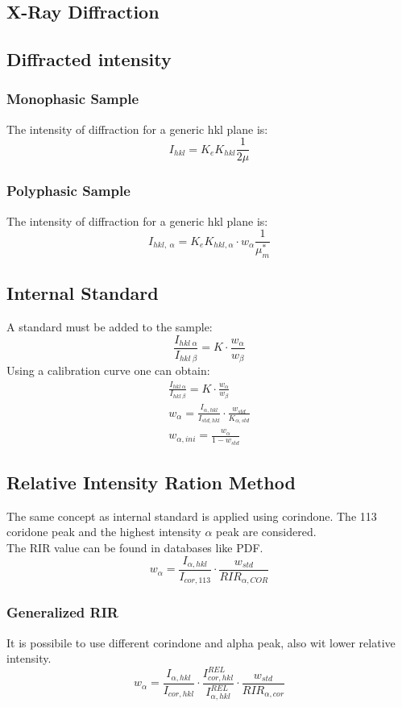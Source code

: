 \documentclass[../Master.tex]{subfiles}
\begin{document}
\begin{multicols*}{2}
	\section{X-Ray Diffraction}
	\subsection{Diffracted intensity}
	\subsubsection{Monophasic Sample}
	The intensity of diffraction for a generic hkl plane is:
	\[
		I_{hkl} = K_{e} K_{hkl} \frac{1}{2 \mu}
	\]
	\subsubsection{Polyphasic Sample}
	The intensity of diffraction for a generic hkl plane is:
	\[
		I_{hkl, \ \alpha} = K_{e} K_{hkl, \alpha } \cdot w_{\alpha} \frac{1}{\mu _{m}^{*}  }
	\]
	\subsection{Internal Standard}
	A standard must be added to the sample:
	\[
		\frac{I_{hkl~\alpha}}{I_{hkl~\beta} } = K \cdot \frac{w_{\alpha}}{w_{\beta}}
	\]
	Using a calibration curve one can obtain:
	\begin{gather*}
		\frac{I_{hkl~\alpha}}{I_{hkl~\beta} } = K\cdot \frac{w_{\alpha}}{w_{\beta}} \\
		w_{\alpha} = \frac{I_{\alpha,hkl}}{I_{std,hkl}} \cdot \frac{w_{std}}{K_{\alpha,std} } \\
		w_{\alpha, ini} = \frac{w_{\alpha}}{1-w_{std}}
	\end{gather*}
	\subsection{Relative Intensity Ration Method}
	The same concept as internal standard is applied using corindone. The 113 coridone peak and the highest intensity	\( \alpha  \) peak are considered. \\
	The RIR value can be found in databases like PDF.
	\[
		w_{\alpha} = \frac{I_{\alpha,hkl}}{I_{cor,113}} \cdot \frac{w_{std}}{RIR_{\alpha ,COR}  }
	\]
	\subsubsection{Generalized RIR}
	It is possibile to use different corindone and alpha peak, also wit lower relative intensity.
	\[
		w_{\alpha} = \frac{I_{\alpha,hkl}}{I_{cor,hkl}} \cdot \frac{I_{cor,hkl}^{REL} }{I_{\alpha, hkl}^{REL}  }\cdot  \frac{w_{std}}{RIR_{\alpha,cor} }
	\]

\end{multicols*}
\end{document}
